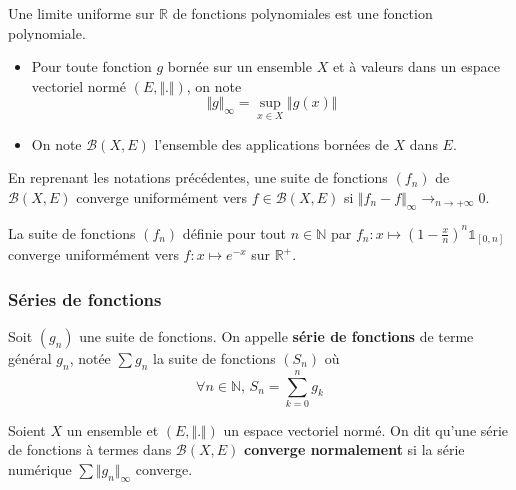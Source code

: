 
  \begin{corollary}
    Une limite uniforme sur $\mathbb{R}$ de fonctions polynomiales est une fonction polynomiale.
  \end{corollary}


  \begin{notation}
    \begin{itemize}
      \item Pour toute fonction $g$ bornée sur un ensemble $X$ et à valeurs dans un espace vectoriel normé $(E, \Vert . \Vert)$, on note
      \[ \Vert g \Vert_\infty = \sup_{x \in X} \Vert g(x) \Vert \]
      \item On note $\mathcal{B}(X,E)$ l'ensemble des applications bornées de $X$ dans $E$.
    \end{itemize}
  \end{notation}

  \begin{proposition}
    En reprenant les notations précédentes, une suite de fonctions $(f_n)$ de $\mathcal{B}(X,E)$ converge uniformément vers $f \in \mathcal{B}(X,E)$ si $\Vert f_n - f \Vert_\infty \longrightarrow_{n \rightarrow +\infty} 0$.
  \end{proposition}

  \begin{example}
    La suite de fonctions $(f_n)$ définie pour tout $n \in \mathbb{N}$ par $f_n : x \mapsto \left( 1 - \frac{x}{n} \right)^n \mathbb{1}_{[0,n]}$ converge uniformément vers $f : x \mapsto e^{-x}$ sur $\mathbb{R}^+$.
  \end{example}

  \subsubsection{Séries de fonctions}


  \begin{definition}
    Soit $(g_n)$ une suite de fonctions. On appelle \textbf{série de fonctions} de terme général $g_n$, notée $\sum g_n$ la suite de fonctions $(S_n)$ où
    \[ \forall n \in \mathbb{N}, \, S_n = \sum_{k=0}^n g_k \]
  \end{definition}

  \begin{definition}
    Soient $X$ un ensemble et $(E, \Vert . \Vert)$ un espace vectoriel normé. On dit qu'une série de fonctions à termes dans $\mathcal{B}(X, E)$ \textbf{converge normalement} si la série numérique $\sum \Vert g_n \Vert_\infty$ converge.
  \end{definition}

